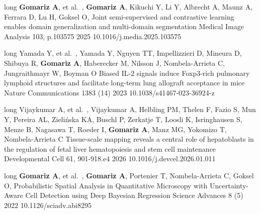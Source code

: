 



\begin{cvpublications}

\cvpublication
{long}
{
    {\textbf{Gomariz A}, et al.~,}
    {\textbf{Gomariz A}, Kikuchi Y, Li Y, Albrecht A, Maunz A, Ferrara D, Lu H, Goksel O,}
}
{Joint semi-supervised and contrastive learning enables domain generalization and multi-domain segmentation}
{Medical Image Analysis}
{103, p.103575}
{2025}
{10.1016/j.media.2025.103575}


\cvpublication
{long}
{
    {Yamada Y, et al.~,}
    {Yamada Y, Nguyen TT, Impellizzieri D, Mineura D, Shibuya R, \textbf{Gomariz A}, Haberecker M, Nilsson J, Nombela-Arrieta C, Jungraithmayr W, Boyman O}
}
{Biased IL-2 signals induce Foxp3-rich pulmonary lymphoid structures and facilitate long-term lung allograft acceptance in mice}
{Nature Communications}
{1383 (14)}
{2023}
{10.1038/s41467-023-36924-z}

\cvpublication
{long}
{
    {Vijaykumar A, et al.~,}
    {Vijaykumar A, Helbling PM, Thelen F, Fazio S, Mun Y, Pereira AL, Zielińska KA, Buschl P, Zerkatje T, Loosli K, Isringhausen S, Menze B, Nagasawa T, Roeder I, \textbf{Gomariz A}, Manz MG, Yokomizo T, Nombela-Arrieta C}
}
{Tissue-scale mapping reveals a central role of hepatoblasts in the regulation of fetal liver hematopoiesis and stem cell maintenance}
{Developmental Cell}
{61, 901-918.e4}
{2026}
{10.1016/j.devcel.2026.01.011}


\cvpublication
{long}
{
    {\textbf{Gomariz A}, et al.~,}
    {\textbf{Gomariz A}, Portenier T, Nombela-Arrieta C, Goksel O,}
}
{Probabilistic Spatial Analysis in Quantitative Microscopy with Uncertainty-Aware Cell Detection using Deep Bayesian Regression}
{Science Advances}
{8 (5)}
{2022}
{10.1126/sciadv.abi8295}


\end{cvpublications}
